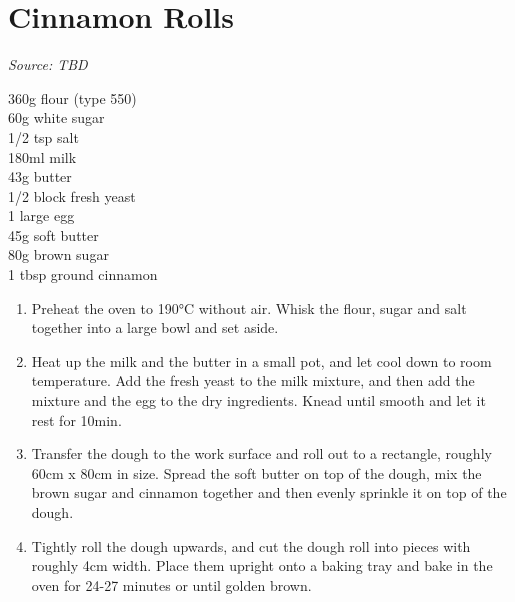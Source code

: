 \documentclass{report}
\begin{document}
\section{Cinnamon Rolls}
\textit{Source: TBD}\\
\begin{minipage}[t]{0.21\textwidth} \vspace{0pt}
360g flour (type 550)\\
60g white sugar\\
1/2 tsp salt\\
180ml milk\\
43g butter\\
1/2 block fresh yeast\\
1 large egg\\

45g soft butter\\
80g brown sugar\\
1 tbsp ground cinnamon
\end{minipage}
\hfill
\begin{minipage}[t]{0.78\textwidth} \vspace{0pt}
	\begin{enumerate}
		\item Preheat the oven to 190°C without air. Whisk the flour, sugar and salt together into a large bowl and set aside.
		\item Heat up the milk and the butter in a small pot, and let cool down to room temperature. Add the fresh yeast to the milk mixture, and then add the mixture and the egg to the dry ingredients. Knead until smooth and let it rest for 10min.
		\item Transfer the dough to the work surface and roll out to a rectangle, roughly 60cm x 80cm in size. Spread the soft butter on top of the dough, mix the brown sugar and cinnamon together and then evenly sprinkle it on top of the dough.
		\item Tightly roll the dough upwards, and cut the dough roll into pieces with roughly 4cm width. Place them upright onto a baking tray and bake in the oven for 24-27 minutes or until golden brown.
	\end{enumerate}	
\end{minipage}
\end{document}
